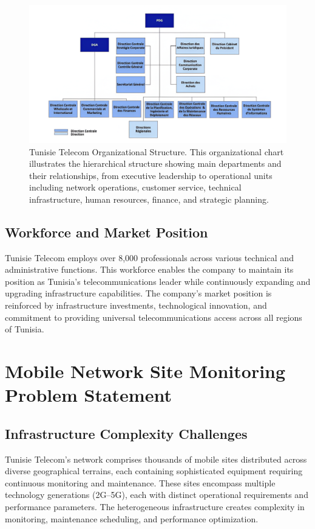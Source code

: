 \begin{figure}[H]
    \centering
    \includegraphics[width=0.85\columnwidth]{img/company/telecom_organigramme.png}
    \caption{Tunisie Telecom Organizational Structure. This organizational chart illustrates the hierarchical structure showing main departments and their relationships, from executive leadership to operational units including network operations, customer service, technical infrastructure, human resources, finance, and strategic planning.}
    \label{fig:tt_organigramme}
\end{figure}

\subsection{Workforce and Market Position}
Tunisie Telecom employs over 8,000 professionals across various technical and administrative functions. This workforce enables the company to maintain its position as Tunisia's telecommunications leader while continuously expanding and upgrading infrastructure capabilities. The company's market position is reinforced by infrastructure investments, technological innovation, and commitment to providing universal telecommunications access across all regions of Tunisia.

\section{Mobile Network Site Monitoring Problem Statement}

\subsection{Infrastructure Complexity Challenges}
Tunisie Telecom's network comprises thousands of mobile sites distributed across diverse geographical terrains, each containing sophisticated equipment requiring continuous monitoring and maintenance. These sites encompass multiple technology generations (2G–5G), each with distinct operational requirements and performance parameters. The heterogeneous infrastructure creates complexity in monitoring, maintenance scheduling, and performance optimization.


